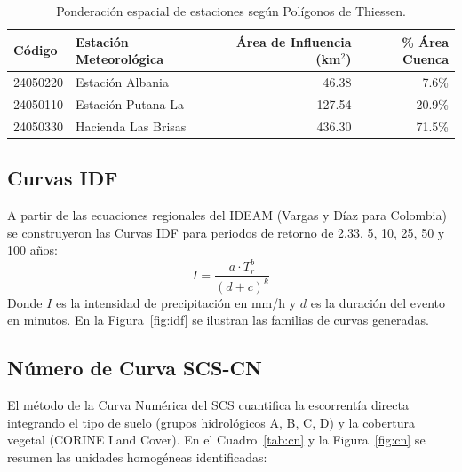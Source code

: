 \documentclass[11pt,a4paper]{article}
\begin{document}
\begin{table}[H]
\centering
\caption{Ponderación espacial de estaciones según Polígonos de Thiessen.}
\label{tab:thiessen}
\begin{tabular}{llrr}\toprule
\textbf{Código} & \textbf{Estación Meteorológica} & \textbf{Área de Influencia (km$^2$)} & \textbf{\% Área Cuenca} \\\midrule
24050220 & Estación Albania & 46.38 & 7.6\% \\
24050110 & Estación Putana La & 127.54 & 20.9\% \\
24050330 & Hacienda Las Brisas & 436.30 & 71.5\% \\
\bottomrule
\end{tabular}
\end{table}



\subsection{Curvas IDF}
A partir de las ecuaciones regionales del IDEAM (Vargas y Díaz para Colombia) se construyeron las Curvas IDF para periodos de retorno de 2.33, 5, 10, 25, 50 y 100 años:
\begin{equation}
I = \frac{a \cdot T_r^b}{(d + c)^k}
\end{equation}
Donde $I$ es la intensidad de precipitación en mm/h y $d$ es la duración del evento en minutos. En la Figura~\ref{fig:idf} se ilustran las familias de curvas generadas.



\subsection{Número de Curva SCS-CN}
El método de la Curva Numérica del SCS cuantifica la escorrentía directa integrando el tipo de suelo (grupos hidrológicos A, B, C, D) y la cobertura vegetal (CORINE Land Cover). En el Cuadro~\ref{tab:cn} y la Figura~\ref{fig:cn} se resumen las unidades homogéneas identificadas:

\begin{table}[H]
\centering
\caption{Cálculo del Número de Curva (CN) por unidades homogéneas de la cuenca.}
\label{tab:cn}
\end{table}
\end{document}
